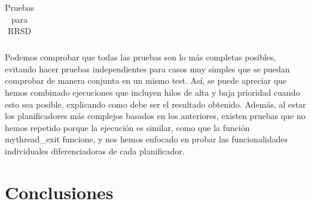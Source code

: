 \documentclass[10pt, spanish, pdftex]{template/UC3M_document}
\begin{document}
\begin{table}[h!]
\begin{tabular}{|C{0.15\textwidth}|C{0.4\textwidth}|C{0.35\textwidth}|}
   \end{tabular}
    \caption{Pruebas para RRSD}
    \label{fig:resultRRSD}
\end{table}

\newpage
Podemos comprobar que todas las pruebas son lo más completas posibles, evitando hacer pruebas independientes para casos muy simples que se puedan comprobar de manera conjunta en un mismo test. Así, se puede apreciar que hemos combinado ejecuciones que incluyen hilos de alta y baja prioridad cuando esto sea posible, explicando como debe ser el resultado obtenido. Además, al estar los planificadores más complejos basados en los anteriores, existen pruebas que no hemos repetido porque la ejecución es similar, como que la función mythread\_exit funcione, y nos hemos enfocado en probar las funcionalidades individuales diferenciadoras de cada planificador.

\newpage
\section{Conclusiones}
\end{document}
